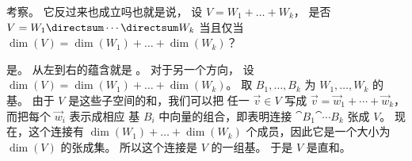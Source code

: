 \begin{exercises}
  \item 
    考察。
    它反过来也成立吗\Dash 也就是说，
    设 \( V=W_1+\dots+ W_k \)，
    是否 \( V=W_1\directsum\cdots\directsum W_k \) 当且仅当
    \( \dim(V)=\dim(W_1)+\dots+\dim(W_k) \)？
    \begin{answer}
      是。
      从左到右的蕴含就是
      。
      对于另一个方向，
      设 \( \dim(V)=\dim(W_1)+\dots+\dim(W_k) \)。
      取 \( B_1,\dots, B_k \) 为 \( W_1,\dots, W_k \) 的基。
      由于 $V$ 是这些子空间的和，我们可以把
      任一 \( \vec{v}\in V \) 写成
      \( \vec{v}=\vec{w}_1+\cdots+\vec{w}_k \)，而把每个
      \( \vec{w}_i \) 表示成相应
      基 \( B_i \) 中向量的组合，即表明连接
      \( \cat{B_1}{\cat{\cdots}{B_k}}  \) 张成 \( V \)。
      现在，这个连接有
      \( \dim(W_1)+\dots+\dim(W_k) \) 个成员，因此它是一个大小为
      \( \dim(V) \) 的张成集。
      所以这个连接是 \( V \) 的一组基。
      于是 \( V \) 是直和。
     \end{answer}
  \item 

\end{exercises}
